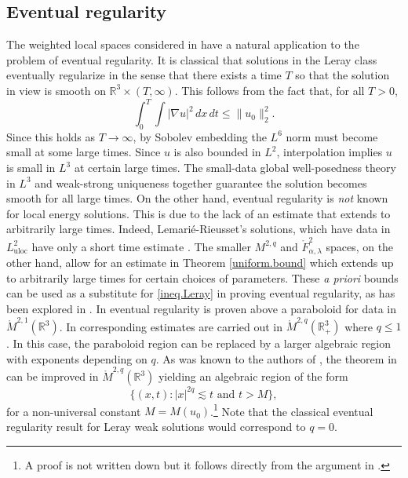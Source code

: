 \documentclass[11pt]{article}
\numberwithin{equation}{section}
\theoremstyle{remark}
\theoremstyle{definition}
\newcommand{\R}{\mathbb{R}}
\newcommand{\nb}{\nabla}
\newcommand\al{\alpha}
\newcommand\la{\lambda}
\newcommand{\I}{\infty}
\newcommand{\EQ}[1]{\begin{equation} #1 \end{equation}}
\newcommand{\uloc}{{\mathrm{uloc}}}
\begin{document}
%
%
\subsection{Eventual regularity}

The weighted local spaces considered in \cite{BT8,BKT,BKO} have a natural application to the problem of eventual regularity. It is classical that solutions in the Leray class eventually regularize in the sense that there exists a time $T$ so that the solution in view is smooth on $\R^3\times (T,\I)$. This follows  from the fact that, for all $T>0$,
\EQ{\label{ineq.Leray}
\int_0^T\int  |\nb u|^2\,dx\,dt \leq  \|u_0\|_2^2.
}
Since this holds as $T\to \I$, by Sobolev embedding the $L^6$ norm must become small at some large times. Since $u$ is also bounded in $L^2$, interpolation implies $u$ is small in $L^3$ at certain large times. The small-data global well-posedness theory in $L^3$ and weak-strong uniqueness together guarantee the solution becomes smooth for all large times.
On the other hand, eventual regularity  is \textit{not} known for local energy solutions. This is due to the lack of an estimate that extends to arbitrarily large times. Indeed, Lemari\'e-Rieusset's solutions, which have data in $L^2_\uloc$ have only a short time estimate \cite{LR,LR2}.  The smaller $M^{2,q}$ and $\mathring F^{2}_{\al,\la}$ spaces, on the other hand, allow for an estimate in Theorem \ref{uniform.bound} which extends up to arbitrarily large times for certain choices of parameters.
These \textit{a priori} bounds can be used as a substitute for \eqref{ineq.Leray} in proving eventual regularity, as has been explored in \cite{BT8,BKT,BKO}.  In \cite{BKT} eventual regularity is proven above a paraboloid for data in $\mathring M^{2,1}(\R^3)$. In \cite{BKO} corresponding estimates are carried out in $\mathring M^{2,q}(\R^3_+)$ where $q\leq 1$. In this case, the paraboloid region can be replaced by a larger algebraic region with exponents depending on $q$. As was known to the authors of \cite{BKO}, the theorem in \cite{BKO} can be improved in  $\mathring M^{2,q}(\R^3)$ yielding an algebraic region of the form
\[
\{(x,t):  |x|^{2q} \lesssim t \text{ and } t>M  \},
\]
for a non-universal constant $M=M(u_0)$.\footnote{A proof is not written down but it follows directly from the argument in \cite{BKO}.}  Note that  the classical eventual regularity result for Leray weak solutions would correspond to $q=0$.
\end{document}

